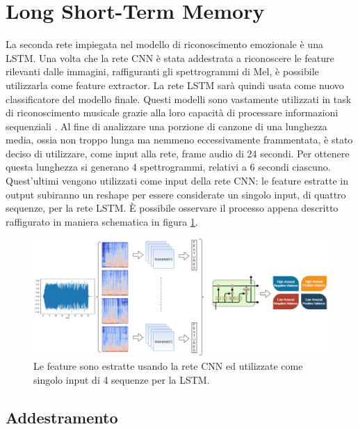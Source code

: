 \documentclass[11pt]{report}
\begin{document}
\newpage

\section{Long Short-Term Memory}


La seconda rete impiegata nel modello di riconoscimento emozionale è una LSTM. Una volta che la rete CNN è stata addestrata a riconoscere le feature rilevanti dalle immagini, raffiguranti gli spettrogrammi di Mel, è possibile utilizzarla come feature extractor. La rete LSTM sarà quindi usata come nuovo classificatore del modello finale. Questi modelli sono vastamente utilizzati in task di riconoscimento musicale grazie alla loro capacità di processare informazioni sequenziali \cite{hochreiter1997long}. Al fine di analizzare una porzione di canzone di una lunghezza media, ossia non troppo lunga ma nemmeno eccessivamente frammentata, è stato deciso di utilizzare, come input alla rete, frame audio di 24 secondi. Per ottenere questa lunghezza si generano 4 spettrogrammi, relativi a 6 secondi ciascuno. Quest'ultimi vengono utilizzati come input della rete CNN: le feature estratte in output subiranno un reshape per essere considerate un singolo input, di quattro sequenze, per la rete LSTM. È possibile osservare il processo appena descritto raffigurato in maniera schematica in figura \ref{fig:lstm-feature}.

\vspace{2cm}

\begin{figure}[h]
\centering
\includegraphics[scale = 0.52]{img/LSTM-Training.png}
\caption{Le feature sono estratte usando la rete CNN ed utilizzate come singolo input di 4 sequenze per la LSTM.}
\label{fig:lstm-feature}
\end{figure}

\newpage


\subsection{Addestramento}
\end{document}
